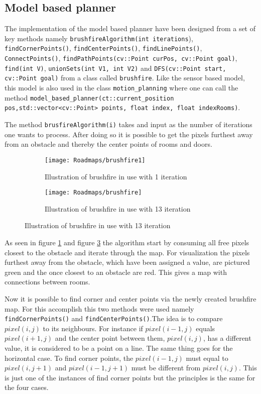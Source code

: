 \documentclass[../Head/Main.tex]{subfiles}
\begin{document}
\subsection{Model based planner}

The implementation of the model based planner have been designed from a set of key methods namely \texttt{brushfireAlgorithm(int iterations}), \texttt{findCornerPoints()}, \texttt{findCenterPoints()}, \texttt{findLinePoints()}, \texttt{ConnectPoints()}, \texttt{findPathPoints(cv::Point curPos, cv::Point goal)}, \texttt{find(int V)}, \texttt{unionSets(int V1, int V2)} and \texttt{DFS(cv::Point start, cv::Point goal)} from a class called \texttt{brushfire}. Like the sensor based model, this model is also used in the class \texttt{motion\_planning} where one can call the method \texttt{model\_based\_planner(ct::current\_position pos,std::vector<cv::Point> points, float index, float indexRooms)}.  

The method \texttt{brusfireAlgorithm(i)} takes and input as the number of iterations one wants to process. After doing so it is possible to get the pixels furthest away from an obstacle and thereby the center points of rooms and doors.   

\begin{figure}[H]
  \begin{subfigure}[b]{0.49\textwidth}
    \centering
    \texttt{[image: Roadmaps/brushfire1]}
    \caption{Illustration of brushfire in use with 1 iteration}
    \label{fig:Brushfire1}
  \end{subfigure}
  \hfill
   \begin{subfigure}[b]{0.49\textwidth}
    \centering
    \texttt{[image: Roadmaps/brushfire]}
    \caption{Illustration of brushfire in use with 13 iteration}
    \label{fig:Brusfire2}
  \end{subfigure}
  \end{figure}
  
As seen in figure \ref{fig:Brushfire1} and figure \ref{fig:Brusfire2} the algorithm start by consuming all free pixels closest to the obstacle and iterate through the map. For visualization the pixels furthest away from the obstacle, which have been assigned a value, are pictured green and the once closest to an obstacle are red. This gives a map with connections between rooms. 
  
Now it is possible to find corner and center points via the newly created brushfire map. For this accomplish this two methods were used namely \texttt{findCornerPoints()} and \texttt{findCenterPoints()}.The idea is to compare $pixel(i,j)$ to its neighbours. For instance if $pixel(i-1,j)$ equals $pixel(i+1,j)$ and the center point between them, $pixel(i,j)$, has a different value, it is considered to be a point on a line. The same thing goes for the horizontal case. To find corner points, the $pixel(i-1,j)$ must equal to $pixel(i,j+1)$ and $pixel(i-1,j+1)$ must be different from $pixel(i,j)$. This is just one of the instances of find corner points but the principles is the same for the four cases.           
\end{document}
